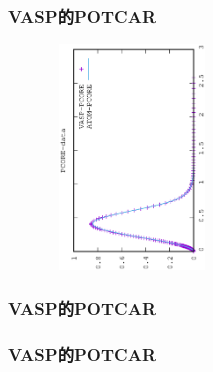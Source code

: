 \frame
{
	\frametitle{\rm{VASP}的\rm{POTCAR}}
\begin{minipage}{0.58\textwidth}
\centering
\vspace{-0.05in}
\fontsize{3.3pt}{1.9pt}\selectfont{
}
\end{minipage}
\begin{minipage}{0.40\textwidth}
\begin{figure}[t!]
\centering
\vspace{-0.05in}
\includegraphics[height=2.35in,width=1.75in,viewport=0 0 350 550, angle=-90, clip]{Figures/PCORE-data.eps}
\label{core_density_Function}
\end{figure}
\end{minipage}
}

\frame
{
	\frametitle{\rm{VASP}的\rm{POTCAR}}
\centering
\vspace{-0.15in}
\fontsize{3.3pt}{1.9pt}\selectfont{
}
}

\frame
{
	\frametitle{\rm{VASP}的\rm{POTCAR}}
\centering
\vspace{-0.15in}
\fontsize{3.3pt}{1.9pt}\selectfont{
}
}

